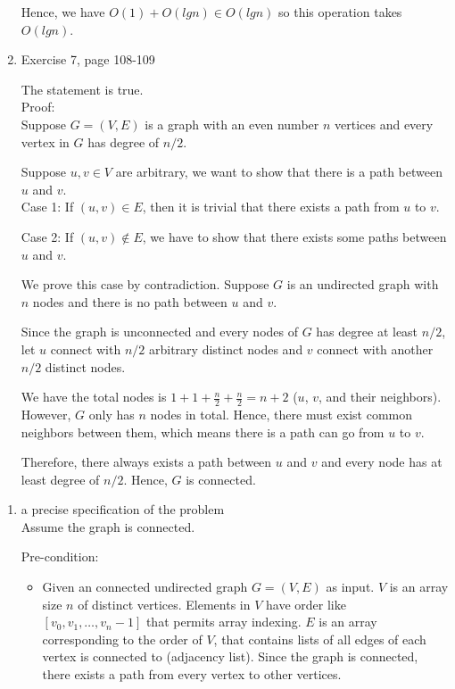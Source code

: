 \documentclass{cpsc413Solutions}
\begin{document}
\begin{problemlist}
\begin{problem}
\begin{answer}
\begin{enumerate}
    Hence, we have ${O}(1) + {O}(lgn) \in {O}(lgn)$ so this operation takes ${O}(lgn)$.
    
    \item Exercise 7, page 108-109
    
    The statement is true. \\
    Proof:\\
    Suppose $G=(V,E)$ is a graph with an even number $n$ vertices and every vertex in $G$ has degree of $n/2$.
    
    Suppose $u,v \in V$ are arbitrary, we want to show that there is a path between $u$ and $v$.\\
    Case 1:
    If $(u,v) \in E$, then it is trivial that there exists a path from $u$ to $v$.
    
    Case 2: If $(u,v) \notin E$, we have to show that there exists some paths between $u$ and $v$.
    
    We prove this case by contradiction. Suppose $G$ is an undirected graph with $n$ nodes and there is no path between $u$ and $v$.
    
    Since the graph is unconnected and every nodes of $G$ has degree at least $n/2$, let $u$ connect with $n/2$ arbitrary distinct nodes and $v$ connect with another $n/2$ distinct nodes.
    
    We have the total nodes is $1+1+\frac{n}{2}+ \frac{n}{2} = n+2$ ($u$, $v$, and their neighbors). However, $G$ only has $n$ nodes in total. Hence, there must exist common neighbors between them, which means there is a path can go from $u$ to $v$. 
    
    Therefore, there always exists a path between $u$ and $v$ and every node has at least degree of $n/2$. Hence, $G$ is connected.
    
\end{enumerate}

\end{answer}
\end{problem}


\begin{problem}
\begin{answer}
\begin{enumerate}
    \item  a precise speciﬁcation of the problem \\
    Assume the graph is connected.
    
    Pre-condition:
    \begin{itemize}
        \item Given an connected undirected graph $G=(V,E)$ as input. $V$ is an array size $n$ of distinct vertices. Elements in $V$ have order like $[v_0,v_1, \dots , v_n-1]$ that permits array indexing. $E$ is an array corresponding to the order of $V$, that contains lists of all edges of each vertex is connected to (adjacency list). Since the graph is connected, there exists a path from every vertex to other vertices. 
        

\end{itemize}
\end{enumerate}
\end{answer}
\end{problem}
\end{problemlist}
\end{document}
